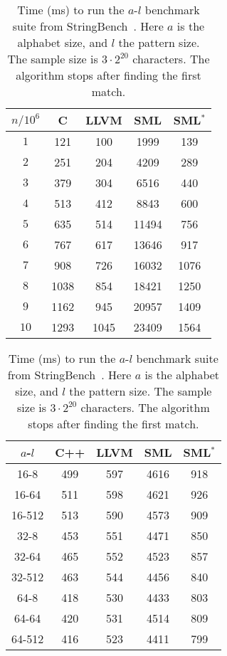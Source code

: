 \documentclass[a4paper,USenglish,cleveref, autoref]{lipics-v2019}
\begin{document}
\begin{table}
\begin{minipage}{.49\textwidth}
  \centering  
  \begin{tabular}{c|cccc}
    $n/10^6$ & C    & LLVM & SML    & SML${}^*$ \\
    \hline
    $1$      & 121  & 100  & 1999   & 139      \\
    $2$      & 251  & 204  & 4209   & 289      \\
    $3$      & 379  & 304  & 6516   & 440      \\
    $4$      & 513  & 412  & 8843   & 600      \\
    $5$      & 635  & 514  & 11494  & 756      \\
    $6$      & 767  & 617  & 13646  & 917      \\
    $7$      & 908  & 726  & 16032  & 1076     \\
    $8$      & 1038 & 854  & 18421  & 1250     \\
    $9$      & 1162 & 945  & 20957  & 1409     \\
    $10$     & 1293 & 1045 & 23409  & 1564     \\
  \end{tabular}
  \caption{Time (ms) to search for the values $0,2,\ldots<5n$ in an array $[0,5,\ldots<5n]$.}\label{tab:bs-runtimes}
\end{minipage}
\hfill
\begin{minipage}{.49\textwidth}
  \centering  
  \begin{tabular}{c|cccc}
    $a$-$l$  & C++  & LLVM & SML  & SML${}^*$\\
    \hline    
    16-8     & 499 & 597  & 4616 & 918 \\
    16-64    & 511 & 598  & 4621 & 926 \\
    16-512   & 513 & 590  & 4573 & 909 \\
    32-8     & 453 & 551  & 4471 & 850 \\
    32-64    & 465 & 552  & 4523 & 857 \\
    32-512   & 463 & 544  & 4456 & 840 \\
    64-8     & 418 & 530  & 4433 & 803 \\
    64-64    & 420 & 531  & 4514 & 809 \\
    64-512   & 416 & 523  & 4411 & 799 \\
  \end{tabular}
  \caption{Time (ms) to run the $a$-$l$ benchmark suite from StringBench~\cite{stringbench}. 
    Here $a$ is the alphabet size, and $l$ the pattern size. The sample size is $3\cdot2^{20}$ characters. 
    The algorithm stops after finding the first match.}\label{tab:kmp-runtimes}
\end{minipage}
\end{table}
\end{document}
